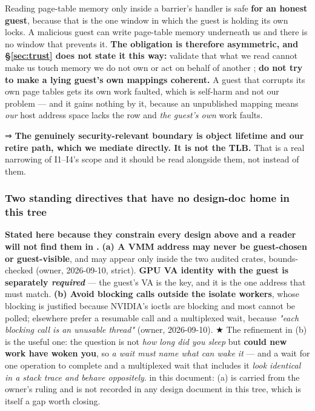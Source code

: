 \documentclass[10.5pt]{article}
\begin{document}
Reading page-table memory only inside a barrier's handler is safe \textbf{for an honest guest},
because that is the one window in which the guest is holding its own locks. A malicious guest can
write page-table memory underneath us and there is no window that prevents it. \textbf{The
obligation is therefore asymmetric, and \S\ref{sec:trust} does not state it this way:} validate
that what we read cannot make us touch memory we do not own or act on behalf of another
; \textbf{do not try to make a lying guest's own mappings coherent.} A guest that
corrupts its own page tables gets its own work faulted, which is self-harm and not our problem
--- and it gains nothing by it, because an unpublished mapping means \emph{our} host address
space lacks the row and \emph{the guest's own} work faults.

⇒ \textbf{The genuinely security-relevant boundary is object lifetime and our retire path, which
we mediate directly. It is not the TLB.} That is a real narrowing of I1--I4's scope and it should
be read alongside them, not instead of them.

\subsubsection*{Two standing directives that have no design-doc home in this tree}

\textbf{Stated here because they constrain every design above and a reader will not find them in
.} \textbf{(a) A VMM address may never be guest-chosen or guest-visible}, and
may appear only inside the two audited  crates, bounds-checked (owner, 2026-09-10,
strict). \textbf{GPU VA identity with the guest is separately \emph{required}} --- the guest's
VA is the key, and it is the one address that must match. \textbf{(b) Avoid blocking calls
outside the isolate workers}, whose blocking is justified because NVIDIA's ioctls are blocking
and most cannot be polled; elsewhere prefer a resumable call and a multiplexed wait, because
\emph{"each blocking call is an unusable thread"} (owner, 2026-09-10). ★ The refinement in (b) is
the useful one: the question is not \emph{how long did you sleep} but \textbf{could new work have
woken you}, so \emph{a wait must name what can wake it} --- and a wait for one operation to
complete and a multiplexed wait that includes it \emph{look identical in a stack trace and behave
oppositely}. \unver{} in this document: (a) is carried from the owner's ruling and is not recorded
in any design document in this tree, which is itself a gap worth closing.
\end{document}
